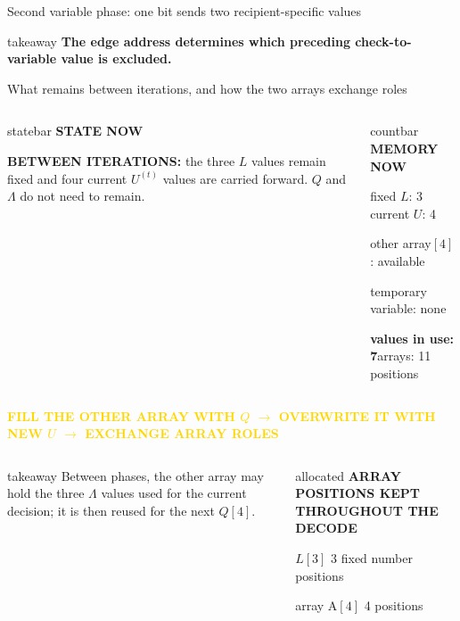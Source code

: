 \documentclass[aspectratio=169,9pt,t]{beamer}
\newcommand{\countstrip}[4]{%
  \begin{columns}[T,onlytextwidth]
    \column{.695\textwidth}
      \begin{beamercolorbox}[rounded=true,sep=.62ex]{statebar}
        \fontsize{6.4}{7.0}\selectfont\textcolor{Muted}{\bfseries STATE NOW}\par
        \vspace{.15ex}\scriptsize #1
      \end{beamercolorbox}
    \column{.285\textwidth}
      \begin{beamercolorbox}[rounded=true,sep=.52ex]{countbar}
        \fontsize{6.4}{7.0}\selectfont\textcolor{BP}{\bfseries MEMORY NOW}\par
        \fontsize{5.9}{6.6}\selectfont
        fixed $L$: 3 \quad current $U$: 4\par
        other array$[4]$: #2\par
        temporary variable: #3\par
        \textbf{values in use: #4}\quad arrays: 11 positions
      \end{beamercolorbox}
  \end{columns}\vspace{.6mm}}
\newcommand{\phase}[1]{%
  \centering\colorbox{GoldSoft}{\strut\scriptsize\bfseries\textcolor{Gold}{#1}}\par\vspace{1mm}}
\newcommand{\takeaway}[1]{%
  \vspace{.6mm}\begin{beamercolorbox}[wd=\textwidth,rounded=true,sep=.6ex]{takeaway}
    \centering\scriptsize\bfseries #1
  \end{beamercolorbox}}
\begin{document}
\begin{frame}{Second variable phase: one bit sends two recipient-specific values}
  \takeaway{The edge address determines which preceding check-to-variable value is excluded.}
\end{frame}

\begin{frame}{What remains between iterations, and how the two arrays exchange roles}
  \countstrip{\textbf{BETWEEN ITERATIONS: }the three $L$ values remain fixed and four current $U^{(t)}$ values are carried forward. $Q$ and $\Lambda$ do not need to remain.}{available}{none}{7}

  \phase{FILL THE OTHER ARRAY WITH $Q$ \quad $\longrightarrow$ \quad OVERWRITE IT WITH NEW $U$ \quad $\longrightarrow$ \quad EXCHANGE ARRAY ROLES}

  \begin{columns}[T,onlytextwidth]
      \centering
      \vspace{1mm}
      \begin{beamercolorbox}[rounded=true,sep=.8ex]{takeaway}
        \centering\scriptsize
        Between phases, the other array may hold the three $\Lambda$ values used for the current decision; it is then reused for the next $Q[4]$.
      \end{beamercolorbox}
      \begin{beamercolorbox}[rounded=true,sep=.8ex]{allocated}
        \scriptsize\textcolor{BP}{\bfseries ARRAY POSITIONS KEPT THROUGHOUT THE DECODE}\par\vspace{.5mm}
        \fontsize{7.2}{8.3}\selectfont
        $L[3]$ \hfill 3 fixed number positions\par
        array A$[4]$ \hfill 4 positions\par

\end{beamercolorbox}
\end{columns}
\end{frame}
\end{document}
